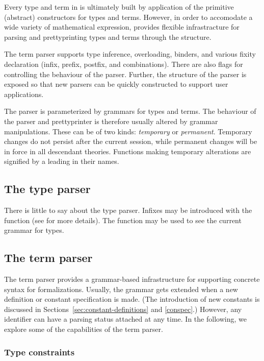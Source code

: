 {Every type and term in \HOL{} is ultimately built by application of
the primitive (abstract) constructors for types and terms. However, in
order to accomodate a wide variety of mathematical expression, \HOL{}
provides flexible infrastracture for parsing and prettyprinting types
and terms through the  structure.

The term parser supports type inference, overloading, binders, and
various fixity declaration (infix, prefix, postfix, and
combinations). There are also flags for controlling the behaviour
of the parser. Further, the structure of the parser is exposed so that
new parsers can be quickly constructed to support user applications.

The parser is parameterized by grammars for types and terms. The
behaviour of the parser and prettyprinter is therefore usually altered
by grammar manipulations. These can be of two kinds: \emph{temporary}
or \emph{permanent}.  Temporary changes do not persist after the
current session, while permanent changes will be in force in all
descendant theories.  Functions making temporary alterations are
signified by a leading  in their names.

\subsection{The type parser}

There is little to say about the type parser. Infixes may be
introduced with the function  (see \REFERENCE{}
for more details).  The function  may be used to
see the current grammar for types.

\subsection{The term parser}

The term parser provides a grammar-based infrastructure for supporting
concrete syntax for formalizations. Usually, the \HOL{} grammar gets
extended when a new definition or constant specification is made. (The
introduction of new constants is discussed in
Sections~\ref{sec:constant-definitions} and \ref{conspec}.) However,
any identifier can have a parsing status attached at any time.
In the following, we explore some of the capabilities of the
\HOL{} term parser.


\subsubsection{Type constraints}

}
